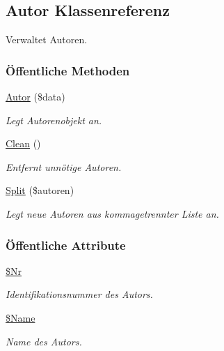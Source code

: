 \hypertarget{classAutor}{
\subsection{Autor Klassenreferenz}
\label{classAutor}
}
Verwaltet Autoren.  


\subsubsection*{\"{O}ffentliche Methoden}
\begin{CompactItemize}
\item 
\hyperlink{classAutor_2302710dd8970853f5d49c62d4586e8f}{Autor} (\$data)
\begin{CompactList}\small\item\em Legt Autorenobjekt an. \item\end{CompactList}\item 
\hyperlink{classAutor_77b27af7e471abe5a404fc92c7319921}{Clean} ()
\begin{CompactList}\small\item\em Entfernt unnötige Autoren. \item\end{CompactList}\item 
\hyperlink{classAutor_2ba5418b6622f414fa8a054e6c2a2db8}{Split} (\$autoren)
\begin{CompactList}\small\item\em Legt neue Autoren aus kommagetrennter Liste an. \item\end{CompactList}\end{CompactItemize}
\subsubsection*{\"{O}ffentliche Attribute}
\begin{CompactItemize}
\item 
\hyperlink{classAutor_23e64634d5dc31b41b7ee9c49b9ea6b9}{\$Nr}
\begin{CompactList}\small\item\em Identifikationsnummer des Autors. \item\end{CompactList}\item 
\hyperlink{classAutor_8602b5705cef83e7c16f4040f9add56d}{\$Name}
\begin{CompactList}\small\item\em Name des Autors. \item\end{CompactList}\end{CompactItemize}


